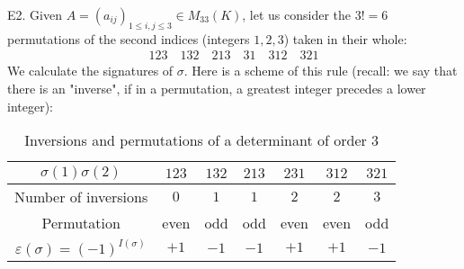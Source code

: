 \begin{tcolorbox}[colframe=black,colback=white,sharp corners]
	E2. Given $A=(a_{ij})_{1\leq i,j\leq 3} \in M_{33}(K)$, let us consider the $3!=6$ permutations of the second indices (integers $1,2,3$) taken in their whole\label{determinant of three by three matrix}:
	\begin{align*}
	123 \quad 132 \quad 213 \quad 31 \quad 312 \quad 321
	\end{align*}
	We calculate the signatures of $\sigma$. Here is a scheme of this rule (recall: we say that there is an "inverse", if in a permutation, a greatest integer precedes a lower integer):
	\begin{table}[H]	
		\begin{center}
			\begin{tabular}{|c|c|c|c|c|c|c|}
			\hline
			  \rowcolor[gray]{0.75}$\sigma(1)\sigma(2)$ & $123$ & $132$ & $213$ & $231$ & $312$ & $321$\\
			  \hline
			  \cellcolor{black!30}Number of inversions & $0$ & $1$ & $1$ & $2$ & $2$ & $3$\\\hline
			  \cellcolor{black!30}Permutation & even & odd & odd & even & even & odd  \\\hline
			  \cellcolor{black!30}$\varepsilon(\sigma)=(-1)^{I(\sigma)}$ & $+1$ & $-1$ & $-1$ & $+1$ & $+1$ & $-1$\\\hline
			\end{tabular}
		\end{center}
		\caption{Inversions and permutations of a determinant of order $3$}
	\end{table}
	\end{tcolorbox}
	
	\pagebreak
	

